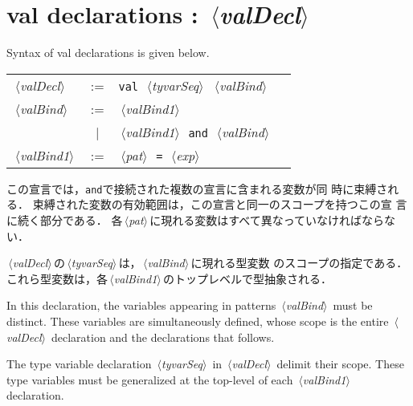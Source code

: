 \documentclass{jbook}
\newcommand{\txt}[2]{#2}
\newcommand{\vbar}{\mbox{\ $|$\ }}
\newcommand{\nonterm}[1]{\mbox{$\,\langle$}{\it #1}\mbox{$\rangle\,$}}
\newcommand{\term}[1]{\mbox{{\tt #1}}}
\begin{document}
\section{\txt{val宣言}{val declarations} : \nonterm{valDecl}}
\label{sec:reference:valdecl}

\txt{val宣言の構文は，以下の文法で定義される．}
    {Syntax of val declarations is given below.}

\begin{center}
\begin{tabular}{lcll}
\nonterm{valDecl}  &:=   & \term{val}\ \nonterm{tyvarSeq}\ \nonterm{valBind}\\
\nonterm{valBind}  &:=   & \nonterm{valBind1} \\
                   &\vbar& \nonterm{valBind1}\ \term{and}\ \nonterm{valBind}
\\
\nonterm{valBind1} &:=   & \nonterm{pat}\ \term{=}\ \nonterm{exp}\\
\end{tabular}
\end{center}

\ifjp%
	この宣言では，\term{and}で接続された複数の宣言に含まれる変数が同
時に束縛される．	
	束縛された変数の有効範囲は，この宣言と同一のスコープを持つこの宣
言に続く部分である．
	各\nonterm{pat}に現れる変数はすべて異なっていなければならない．

	\nonterm{valDecl}の\nonterm{tyvarSeq}は，\nonterm{valBind}に現れる型変数
のスコープの指定である．
	これら型変数は，各\nonterm{valBind1}のトップレベルで型抽象される．

\else%
	In this declaration, the variables appearing in patterns
\nonterm{valBind} must be distinct.
	These variables are simultaneously defined, whose scope is the
entire \nonterm{valDecl} declaration and the declarations that follows.

	The type variable declaration \nonterm{tyvarSeq} in
\nonterm{valDecl} delimit their scope.
	These type variables must be generalized at the top-level of
each \nonterm{valBind1} declaration.
\fi%
\end{document}
